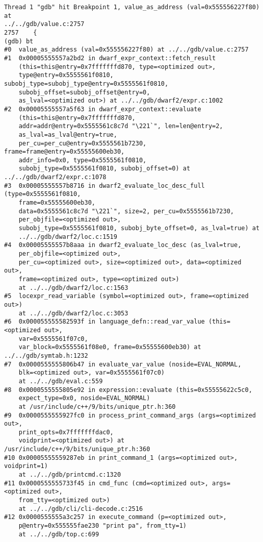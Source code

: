\documentclass{report}
\begin{document}
\begin{verbatim}
Thread 1 "gdb" hit Breakpoint 1, value_as_address (val=0x555556227f80) at 
../../gdb/value.c:2757
2757	{
(gdb) bt
#0  value_as_address (val=0x555556227f80) at ../../gdb/value.c:2757
#1  0x00005555557a2bd2 in dwarf_expr_context::fetch_result 
    (this=this@entry=0x7fffffffd870, type=<optimized out>, 
    type@entry=0x5555561f0810, subobj_type=subobj_type@entry=0x5555561f0810, 
    subobj_offset=subobj_offset@entry=0, 
    as_lval=<optimized out>) at ../../gdb/dwarf2/expr.c:1002
#2  0x00005555557a5f63 in dwarf_expr_context::evaluate 
    (this=this@entry=0x7fffffffd870, 
    addr=addr@entry=0x5555561c8c7d "\221`", len=len@entry=2, 
    as_lval=as_lval@entry=true, 
    per_cu=per_cu@entry=0x5555561b7230, frame=frame@entry=0x55555600eb30, 
    addr_info=0x0, type=0x5555561f0810, 
    subobj_type=0x5555561f0810, subobj_offset=0) at ../../gdb/dwarf2/expr.c:1078
#3  0x00005555557b8716 in dwarf2_evaluate_loc_desc_full (type=0x5555561f0810, 
    frame=0x55555600eb30, 
    data=0x5555561c8c7d "\221`", size=2, per_cu=0x5555561b7230, 
    per_objfile=<optimized out>, 
    subobj_type=0x5555561f0810, subobj_byte_offset=0, as_lval=true) at 
    ../../gdb/dwarf2/loc.c:1519
#4  0x00005555557b8aaa in dwarf2_evaluate_loc_desc (as_lval=true, 
    per_objfile=<optimized out>, 
    per_cu=<optimized out>, size=<optimized out>, data=<optimized out>, 
    frame=<optimized out>, type=<optimized out>)
    at ../../gdb/dwarf2/loc.c:1563
#5  locexpr_read_variable (symbol=<optimized out>, frame=<optimized out>) 
    at ../../gdb/dwarf2/loc.c:3053
#6  0x000055555582593f in language_defn::read_var_value (this=<optimized out>, 
    var=0x5555561f07c0, 
    var_block=0x5555561f08e0, frame=0x55555600eb30) at ../../gdb/symtab.h:1232
#7  0x0000555555806b47 in evaluate_var_value (noside=EVAL_NORMAL, 
    blk=<optimized out>, var=0x5555561f07c0)
    at ../../gdb/eval.c:559
#8  0x0000555555805e92 in expression::evaluate (this=0x55555622c5c0, 
    expect_type=0x0, noside=EVAL_NORMAL)
    at /usr/include/c++/9/bits/unique_ptr.h:360
#9  0x0000555555927fc0 in process_print_command_args (args=<optimized out>, 
    print_opts=0x7fffffffdac0, 
    voidprint=<optimized out>) at /usr/include/c++/9/bits/unique_ptr.h:360
#10 0x00005555559287eb in print_command_1 (args=<optimized out>, voidprint=1) 
    at ../../gdb/printcmd.c:1320
#11 0x0000555555733f45 in cmd_func (cmd=<optimized out>, args=<optimized out>, 
    from_tty=<optimized out>)
    at ../../gdb/cli/cli-decode.c:2516
#12 0x0000555555a3c257 in execute_command (p=<optimized out>, 
    p@entry=0x555555fae230 "print pa", from_tty=1)
    at ../../gdb/top.c:699

\end{verbatim}
\end{document}
